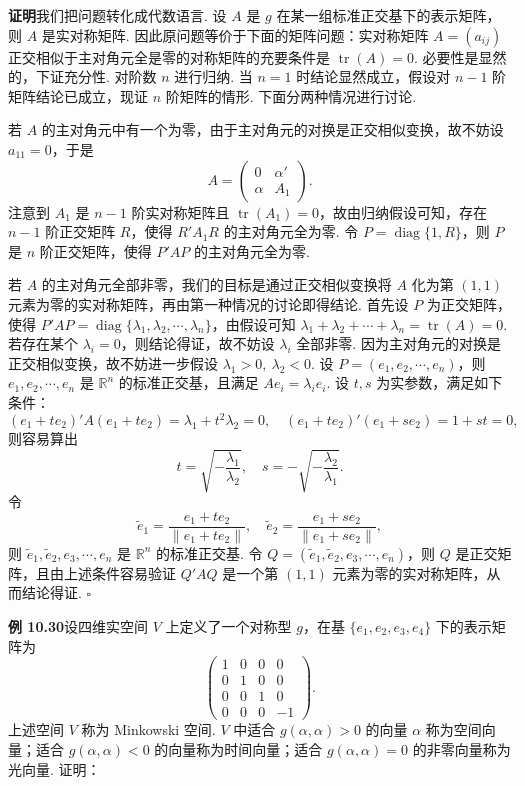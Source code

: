 \documentclass[UTF8,12pt,a4paper,fontset=fandol]{ctexart}
\begin{document}
\noindent\textbf{证明}\quad 我们把问题转化成代数语言. 设 $A$ 是 $g$ 在某一组标准正交基下的表示矩阵，则 $A$ 是实对称矩阵. 因此原问题等价于下面的矩阵问题：实对称矩阵 $A=(a_{ij})$ 正交相似于主对角元全是零的对称矩阵的充要条件是 $\operatorname{tr}(A)=0$. 必要性是显然的，下证充分性. 对阶数 $n$ 进行归纳. 当 $n=1$ 时结论显然成立，假设对 $n-1$ 阶矩阵结论已成立，现证 $n$ 阶矩阵的情形. 下面分两种情况进行讨论.

若 $A$ 的主对角元中有一个为零，由于主对角元的对换是正交相似变换，故不妨设 $a_{11}=0$，于是
\[
A=\left(\begin{array}{cc}
0 & \alpha'\\
\alpha & A_1
\end{array}\right).
\]
注意到 $A_1$ 是 $n-1$ 阶实对称矩阵且 $\operatorname{tr}(A_1)=0$，故由归纳假设可知，存在 $n-1$ 阶正交矩阵 $R$，使得 $R'A_1R$ 的主对角元全为零. 令 $P=\operatorname{diag}\{1,R\}$，则 $P$ 是 $n$ 阶正交矩阵，使得 $P'AP$ 的主对角元全为零.

若 $A$ 的主对角元全部非零，我们的目标是通过正交相似变换将 $A$ 化为第 $(1,1)$ 元素为零的实对称矩阵，再由第一种情况的讨论即得结论. 首先设 $P$ 为正交矩阵，使得 $P'AP=\operatorname{diag}\{\lambda_1,\lambda_2,\cdots,\lambda_n\}$，由假设可知 $\lambda_1+\lambda_2+\cdots+\lambda_n=\operatorname{tr}(A)=0$. 若存在某个 $\lambda_i=0$，则结论得证，故不妨设 $\lambda_i$ 全部非零. 因为主对角元的对换是正交相似变换，故不妨进一步假设 $\lambda_1>0,\ \lambda_2<0$. 设 $P=(e_1,e_2,\cdots,e_n)$，则 $e_1,e_2,\cdots,e_n$ 是 $\mathbb{R}^n$ 的标准正交基，且满足 $Ae_i=\lambda_i e_i$. 设 $t,s$ 为实参数，满足如下条件：
\[
(e_1+te_2)'A(e_1+te_2)=\lambda_1+t^2\lambda_2=0,\quad
(e_1+te_2)'(e_1+se_2)=1+st=0,
\]
则容易算出
\[
t=\sqrt{-\frac{\lambda_1}{\lambda_2}},\quad
s=-\sqrt{-\frac{\lambda_2}{\lambda_1}}.
\]
令
\[
\widetilde e_1=\frac{e_1+te_2}{\|e_1+te_2\|},\quad
\widetilde e_2=\frac{e_1+se_2}{\|e_1+se_2\|},
\]
则 $\widetilde e_1,\widetilde e_2,e_3,\cdots,e_n$ 是 $\mathbb{R}^n$ 的标准正交基. 令 $Q=(\widetilde e_1,\widetilde e_2,e_3,\cdots,e_n)$，则 $Q$ 是正交矩阵，且由上述条件容易验证 $Q'AQ$ 是一个第 $(1,1)$ 元素为零的实对称矩阵，从而结论得证. $\square$

\noindent\textbf{例 10.30}\quad 设四维实空间 $V$ 上定义了一个对称型 $g$，在基 $\{e_1,e_2,e_3,e_4\}$ 下的表示矩阵为
\[
\left(\begin{array}{rrrr}
1 & 0 & 0 & 0\\
0 & 1 & 0 & 0\\
0 & 0 & 1 & 0\\
0 & 0 & 0 & -1
\end{array}\right).
\]
上述空间 $V$ 称为 Minkowski 空间. $V$ 中适合 $g(\alpha,\alpha)>0$ 的向量 $\alpha$ 称为空间向量；适合 $g(\alpha,\alpha)<0$ 的向量称为时间向量；适合 $g(\alpha,\alpha)=0$ 的非零向量称为光向量. 证明：
\end{document}
